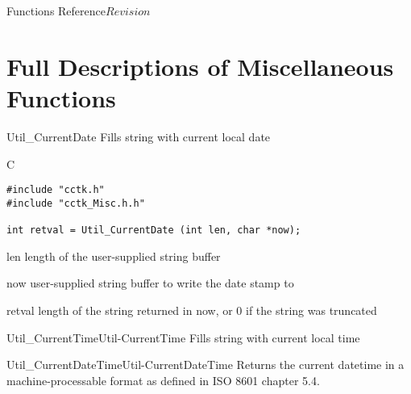 \begin{cactuspart}{ Functions Reference}{}{$Revision$}
\begin{Lentry}
\end{Lentry}


\chapter{Full Descriptions of Miscellaneous Functions}

\begin{FunctionDescription}{Util\_CurrentDate}
\label{Util-CurrentDate}
Fills string with current local date

\begin{SynopsisSection}
\begin{Synopsis}{C}
\begin{verbatim}
#include "cctk.h"
#include "cctk_Misc.h.h"

int retval = Util_CurrentDate (int len, char *now);
\end{verbatim}
\end{Synopsis}
\end{SynopsisSection}

\begin{ParameterSection}
\begin{Parameter}{len}
length of the user-supplied string buffer 
\end{Parameter}
\begin{Parameter}{now}
user-supplied string buffer to write the date stamp to
\end{Parameter}
\end{ParameterSection}

\begin{ResultSection}
\begin{Result}{retval}
length of the string returned in {\code now}, or 0 if the string was truncated
\end{Result}
\end{ResultSection}

\begin{SeeAlsoSection}
\begin{SeeAlso2}{Util\_CurrentTime}{Util-CurrentTime}
  Fills string with current local time
\end{SeeAlso2}
\begin{SeeAlso2}{Util\_CurrentDateTime}{Util-CurrentDateTime}
  Returns the current datetime in a machine-processable format
  as defined in ISO 8601 chapter 5.4.
\end{SeeAlso2}
\end{SeeAlsoSection}


\end{FunctionDescription}
\end{cactuspart}
